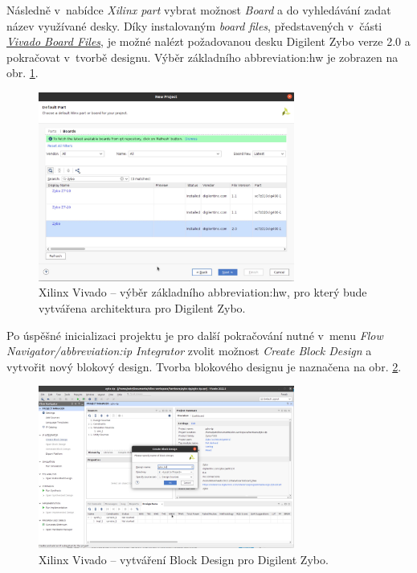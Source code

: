 \documentclass[a4paper, twoside, 11pt]{article}
\begin{document}
\begin{appendices}
		Následně v~nabídce \textit{Xilinx part} vybrat možnost \textit{Board} a do vyhledávání zadat název využívané desky. Díky instalovaným \textit{board files}, představených v~části \hyperref[subsec:vivado-board-files]{\textit{Vivado Board Files}}, je možné nalézt požadovanou desku Digilent Zybo verze 2.0 a pokračovat v~tvorbě designu. Výběr základního \gls{abbreviation:hw} je zobrazen na obr. \ref{fig:zybo-xilinx-vivado-flow-02}.

		\begin{figure}[htbp!]
			\centering
			\includegraphics[width=0.75\textwidth]{src/png/zybo-xilinx-vivado-flow/zybo-xilinx-vivado-flow-02.jpg}
			\caption{Xilinx Vivado – výběr základního \gls{abbreviation:hw}, pro který bude vytvářena architektura pro Digilent Zybo.}
			\label{fig:zybo-xilinx-vivado-flow-02}
		\end{figure}
		
		Po úspěšné inicializaci projektu je pro další pokračování nutné v~menu \textit{Flow Navigator/\gls{abbreviation:ip} Integrator} zvolit možnost \textit{Create Block Design} a vytvořit nový blokový design. Tvorba blokového designu je naznačena na obr. \ref{fig:zybo-xilinx-vivado-flow-05}.
		
		\begin{figure}[htbp!]
			\centering
			\includegraphics[width=0.75\textwidth]{src/png/zybo-xilinx-vivado-flow/zybo-xilinx-vivado-flow-05.jpg}
			\caption{Xilinx Vivado – vytváření Block Design pro Digilent Zybo.}
			\label{fig:zybo-xilinx-vivado-flow-05}
		\end{figure}


\end{appendices}
\end{document}
